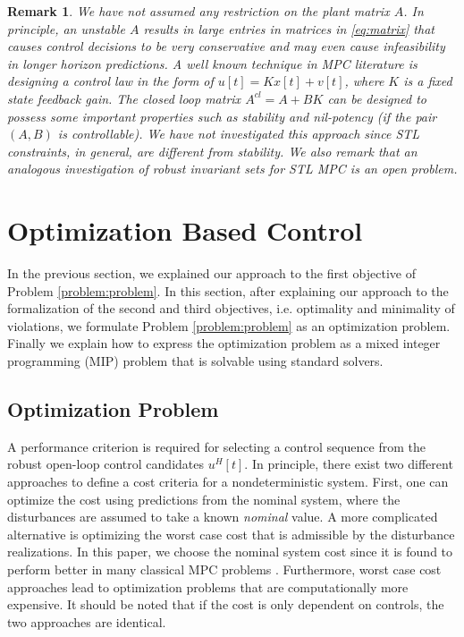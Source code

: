 \documentclass[letterpaper, 10 pt, conference]{ieeeconf}
\newtheorem{remark}{Remark}
\begin{document}
\begin{remark}
We have not assumed any restriction on the plant matrix $A$. In principle, an unstable $A$ results in large entries in matrices in \eqref{eq:matrix} that causes control decisions to be very conservative and may even cause infeasibility in longer horizon predictions. A well known technique in MPC literature is designing a control law in the form of $u[t]=Kx[t]+v[t]$, where $K$ is a fixed state feedback gain. The closed loop matrix $A^{cl}=A+BK$ can be designed to possess some important properties such as stability and nil-potency (if the pair $(A,B)$ is controllable). We have not investigated this approach since STL constraints, in general, are different from stability. We also remark that an analogous investigation of robust invariant sets \cite{bemporad1999robust} for STL MPC is an open problem.
\end{remark}











\section{Optimization Based Control}
\label{sec:optimization}

In the previous section, we explained our approach to the first objective of Problem \ref{problem:problem}. In this section, after explaining our approach to the formalization of the second and third objectives, i.e. optimality and minimality of violations, we formulate Problem \ref{problem:problem} as an optimization problem. Finally we explain how to express the optimization problem as a mixed integer programming (MIP) problem that is solvable using standard solvers. 





\subsection{Optimization Problem}
A performance criterion is required for selecting a control sequence from the robust open-loop control candidates $u^H[t]$. In principle, there exist two different approaches to define a cost criteria for a nondeterministic system. First, one can optimize the cost using predictions from the nominal system, where the disturbances are assumed to take a known \emph{nominal} value. A more complicated alternative is optimizing the worst case cost that is admissible by the disturbance realizations. In this paper, we choose the nominal system cost since it is found to perform better in many classical MPC problems \cite{bemporad1999robust}. Furthermore, worst case cost approaches lead to optimization problems that are computationally more expensive. It should be noted that if the cost is only dependent on controls, the two approaches are identical.  
\end{document}
